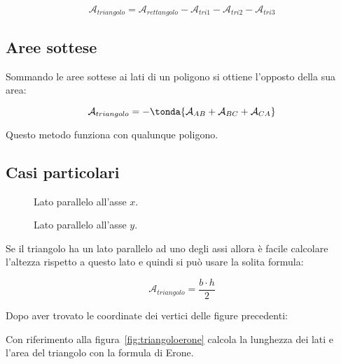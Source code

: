 \[\mathcal{A}_{triangolo} = \mathcal{A}_{rettangolo}-\mathcal{A}_{tri1}
                                                    -\mathcal{A}_{tri2}
                                                    -\mathcal{A}_{tri3}\]

\subsection*{Aree sottese}
Sommando le aree sottese ai lati di un poligono si ottiene l'opposto della 
sua area:

\[\mathcal{A}_{triangolo} = -\tonda{\mathcal{A}_{AB} + 
                            \mathcal{A}_{BC} +
                            \mathcal{A}_{CA}}\]

Questo metodo funziona con qualunque poligono.

\subsection*{Casi particolari}

\begin{inaccessibleblock}
 \begin{figure}[h]
 \centering
 \begin{minipage}[t]{.45\textwidth}
  \centering \triangoloparallelox
  \caption{Lato parallelo all'asse \(x\).}
\label{fig:triangoloparallelox}
 \end{minipage}\hfil
 \begin{minipage}[t]{.45\textwidth}
    \centering \triangoloparalleloy
  \caption{Lato parallelo all'asse \(y\).}\label{fig:triangoloparalleloy}
 \end{minipage}\hfil
\end{figure}
\end{inaccessibleblock}

Se il triangolo ha un lato parallelo ad uno degli assi allora è facile 
calcolare l'altezza rispetto a questo lato e quindi si può usare la 
solita formula:

\[\mathcal{A}_{triangolo} = \frac{b \cdot h}{2}\]

 Dopo aver trovato le coordinate dei vertici delle figure precedenti:

 \begin{esempio}
 \label{ex:D.18}
  Con riferimento alla figura~\ref{fig:triangoloerone} calcola 
  la lunghezza dei lati e l'area del triangolo con la formula di Erone.
 \end{esempio}

